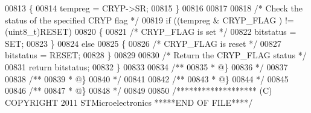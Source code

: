 \begin{DoxyCode}
00813   \{
00814     tempreg = CRYP->SR;
00815   \}
00816 
00817 
00818   \textcolor{comment}{/* Check the status of the specified CRYP flag */}
00819   \textcolor{keywordflow}{if} ((tempreg & CRYP\_FLAG ) != (uint8\_t)RESET)
00820   \{
00821     \textcolor{comment}{/* CRYP\_FLAG is set */}
00822     bitstatus = SET;
00823   \}
00824   \textcolor{keywordflow}{else}
00825   \{
00826     \textcolor{comment}{/* CRYP\_FLAG is reset */}
00827     bitstatus = RESET;
00828   \}
00829 
00830   \textcolor{comment}{/* Return the CRYP\_FLAG status */}
00831   \textcolor{keywordflow}{return}  bitstatus;
00832 \}
00833 
00834 \textcolor{comment}{/**}
00835 \textcolor{comment}{  * @\}}
00836 \textcolor{comment}{  */}
00837 
00838 \textcolor{comment}{/**}
00839 \textcolor{comment}{  * @\}}
00840 \textcolor{comment}{  */}
00841 
00842 \textcolor{comment}{/**}
00843 \textcolor{comment}{  * @\}}
00844 \textcolor{comment}{  */}
00845 
00846 \textcolor{comment}{/**}
00847 \textcolor{comment}{  * @\}}
00848 \textcolor{comment}{  */}
00849 
00850 \textcolor{comment}{/******************* (C) COPYRIGHT 2011 STMicroelectronics *****END OF FILE****/}
\end{DoxyCode}
